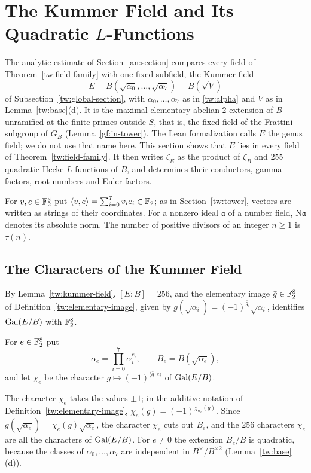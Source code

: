 \section{\texorpdfstring{The Kummer Field and Its Quadratic $L$-Functions}{The Kummer Field and Its Quadratic L-Functions}}\label{gf:section}

The analytic estimate of Section~\ref{an:section} compares every field of
Theorem~\ref{tw:field-family} with one fixed subfield, the Kummer field
\[
 E=B(\sqrt{\alpha_0},\ldots,\sqrt{\alpha_7})=B(\sqrt V)
\]
of Subsection~\ref{tw:global-section}, with $\alpha_0,\ldots,\alpha_7$ as in
\eqref{tw:alpha} and $V$ as in Lemma~\ref{tw:base}(d). It is the maximal
elementary abelian $2$-extension of $B$ unramified at the finite primes
outside $S$, that is, the fixed field of the Frattini subgroup of $G_B$
(Lemma~\ref{gf:in-tower}). The Lean formalization calls $E$ the genus field;
we do not use that name here.
This section shows that $E$ lies in every field of
Theorem~\ref{tw:field-family}. It then writes $\zeta_E$ as the product of
$\zeta_B$ and $255$ quadratic Hecke $L$-functions of $B$, and determines
their conductors, gamma factors, root numbers and Euler factors.

For $v,e\in\mathbb F_2^8$ put $\langle v,e\rangle=\sum_{i=0}^7v_ie_i\in\mathbb F_2$; as
in Section~\ref{tw:tower}, vectors are written as strings of their
coordinates. For a nonzero ideal $\mathfrak a$ of a number field,
$\mathrm N\mathfrak a$ denotes its absolute norm. The number of positive
divisors of an integer $n\ge1$ is $\tau(n)$.

\subsection{The Characters of the Kummer Field}
By Lemma~\ref{tw:kummer-field}, $[E:B]=256$, and the elementary image
$\bar g\in\mathbb F_2^8$ of Definition~\ref{tw:elementary-image}, given by
$g(\sqrt{\alpha_i})=(-1)^{\bar g_i}\sqrt{\alpha_i}$, identifies $\operatorname{Gal}(E/B)$
with $\mathbb F_2^8$.

\begin{definition}\label{gf:characters}
For $e\in\mathbb F_2^8$ put
\[
 \alpha_e=\prod_{i=0}^7\alpha_i^{e_i},\qquad B_e=B(\sqrt{\alpha_e}),
\]
and let $\chi_e$ be the character $g\mapsto(-1)^{\langle\bar g,e\rangle}$ of
$\operatorname{Gal}(E/B)$.
\end{definition}

The character $\chi_e$ takes the values $\pm1$; in the additive notation of
Definition~\ref{tw:elementary-image}, $\chi_e(g)=(-1)^{\chi_{\alpha_e}(g)}$.
Since $g(\sqrt{\alpha_e})=\chi_e(g)\sqrt{\alpha_e}$,
the character $\chi_e$ cuts out $B_e$, and the $256$ characters $\chi_e$ are
all the characters of $\operatorname{Gal}(E/B)$. For $e\ne0$ the extension $B_e/B$ is
quadratic, because the classes of $\alpha_0,\ldots,\alpha_7$ are independent
in $B^\times/B^{\times2}$ (Lemma~\ref{tw:base}(d)).

